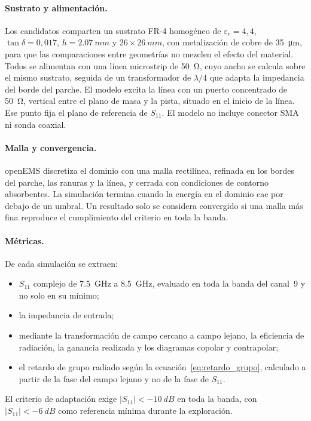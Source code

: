 \documentclass[11pt,a4paper]{article}
\begin{document}
\paragraph{Sustrato y alimentación.} Los candidatos comparten un sustrato FR-4 homogéneo de
$\varepsilon_r = 4{,}4$, $\tan\delta = 0{,}017$, $h = \SI{2.07}{mm}$ y $26 \times \SI{26}{mm}$, con
metalización de cobre de \SI{35}{\micro m}, para que las comparaciones entre geometrías no mezclen
el efecto del material. Todos se alimentan con una línea microstrip de \SI{50}{\ohm}, cuyo ancho
se calcula sobre el mismo sustrato, seguida de un transformador de $\lambda/4$ que adapta la
impedancia del borde del parche. El modelo excita la línea con un
puerto concentrado de \SI{50}{\ohm}, vertical entre el plano de masa y la pista, situado en el
inicio de la línea. Ese punto fija el plano de referencia de $S_{11}$. El modelo no incluye
conector SMA ni sonda coaxial.

\paragraph{Malla y convergencia.} openEMS discretiza el dominio con una malla rectilínea, refinada
en los bordes del parche, las ranuras y la línea, y cerrada con condiciones de contorno
absorbentes. La simulación termina cuando la energía en el dominio cae por debajo de un umbral.
Un resultado solo se considera convergido si una malla más fina reproduce el cumplimiento del
criterio en toda la banda.

\paragraph{Métricas.} De cada simulación se extraen:
\begin{itemize}
    \item $S_{11}$ complejo de \SI{7.5}{GHz} a \SI{8.5}{GHz}, evaluado en toda la banda del
    canal~9 y no solo en su mínimo;
    \item la impedancia de entrada;
    \item mediante la transformación de campo cercano a campo lejano, la eficiencia de radiación,
    la ganancia realizada y los diagramas copolar y contrapolar;
    \item el retardo de grupo radiado según la ecuación~\eqref{eq:retardo_grupo}, calculado a
    partir de la fase del campo lejano y no de la fase de $S_{11}$.
\end{itemize}
El criterio de adaptación exige $|S_{11}| < \SI{-10}{dB}$ en toda la banda, con
$|S_{11}| < \SI{-6}{dB}$ como referencia mínima durante la exploración.
\end{document}
